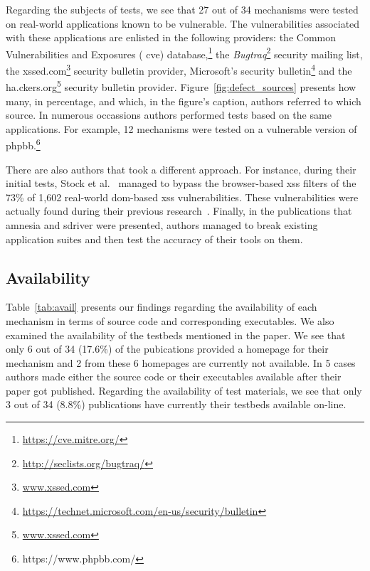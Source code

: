 \documentclass[conference]{IEEEtran}
\begin{document}
Regarding the subjects of tests, we see that 27 out of 34 mechanisms
were tested on real-world applications known to be vulnerable. The
vulnerabilities associated with these applications are enlisted in the
following providers: the Common Vulnerabilities and Exposures ({\sc
  cve}) database,\footnote{\url{https://cve.mitre.org/}} the {\it
  Bugtraq}\footnote{\url{http://seclists.org/bugtraq/}} security
mailing list, the {\sc xss}ed.com\footnote{\url{www.xssed.com}}
security bulletin provider, Microsoft's security
bulletin\footnote{\url{https://technet.microsoft.com/en-us/security/bulletin}}
and the ha.ckers.org\footnote{\url{www.xssed.com}} security bulletin
provider. Figure~\ref{fig:defect_sources} presents how many, in percentage,
and which, in the figure's caption, authors referred
to which source. In numerous occassions authors performed tests based
on the same applications. For example, 12 mechanisms were tested on a
vulnerable version of {\sc phpbb}.\footnote{https://www.phpbb.com/}

There are also authors that took a different approach.
For instance, during their initial tests,
Stock et al.~\cite{SLMS14} managed to bypass
the browser-based {\sc xss} filters of the
73\% of 1,602 real-world {\sc dom}-based {\sc xss} vulnerabilities.
These vulnerabilities were actually found during
their previous research~\cite{LSJ13}.
Finally, in the publications that
{\sc amnesia} and {\sc sd}river were presented,
authors managed to break existing application suites
and then test the accuracy of their tools on them.




\subsection{Availability}

Table~\ref{tab:avail} presents our findings regarding the availability
of each mechanism in terms of source code and corresponding
executables. We also examined the availability of the testbeds
mentioned in the paper. We see that only 6 out of 34 (17.6\%) of the
pubications provided a homepage for their mechanism and 2 from these 6
homepages are currently not available. In 5 cases authors made either
the source code or their executables available after their paper got
published. Regarding the availability of test materials, we see that
only 3 out of 34 (8.8\%) publications have currently their testbeds
available on-line.
\end{document}
